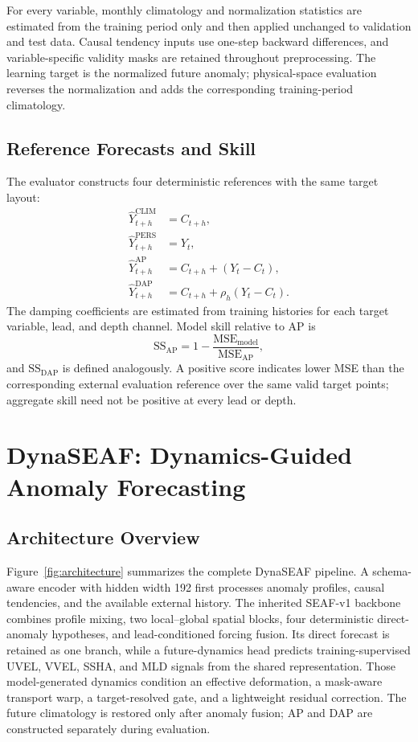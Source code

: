 \documentclass[conference]{IEEEtran}
\begin{document}
For every variable, monthly climatology and normalization statistics are estimated from the training period only and then applied unchanged to validation and test data. Causal tendency inputs use one-step backward differences, and variable-specific validity masks are retained throughout preprocessing. The learning target is the normalized future anomaly; physical-space evaluation reverses the normalization and adds the corresponding training-period climatology.

\subsection{Reference Forecasts and Skill}
The evaluator constructs four deterministic references with the same target layout:
\begin{align}
\widehat{Y}^{\mathrm{CLIM}}_{t+h}&=C_{t+h},\\
\widehat{Y}^{\mathrm{PERS}}_{t+h}&=Y_t,\\
\widehat{Y}^{\mathrm{AP}}_{t+h}&=C_{t+h}+(Y_t-C_t),\\
\widehat{Y}^{\mathrm{DAP}}_{t+h}&=C_{t+h}+\rho_h(Y_t-C_t).
\label{eq:references}
\end{align}
The damping coefficients are estimated from training histories for each target variable, lead, and depth channel. Model skill relative to AP is
\begin{equation}
\mathrm{SS}_{\mathrm{AP}}=1-\frac{\mathrm{MSE}_{\mathrm{model}}}{\mathrm{MSE}_{\mathrm{AP}}},
\label{eq:ssap}
\end{equation}
and $\mathrm{SS}_{\mathrm{DAP}}$ is defined analogously. A positive score indicates lower MSE than the corresponding external evaluation reference over the same valid target points; aggregate skill need not be positive at every lead or depth.

\section{DynaSEAF: Dynamics-Guided Anomaly Forecasting}

\subsection{Architecture Overview}
Figure~\ref{fig:architecture} summarizes the complete DynaSEAF pipeline. A schema-aware encoder with hidden width 192 first processes anomaly profiles, causal tendencies, and the available external history. The inherited SEAF-v1 backbone combines profile mixing, two local--global spatial blocks, four deterministic direct-anomaly hypotheses, and lead-conditioned forcing fusion. Its direct forecast is retained as one branch, while a future-dynamics head predicts training-supervised UVEL, VVEL, SSHA, and MLD signals from the shared representation. Those model-generated dynamics condition an effective deformation, a mask-aware transport warp, a target-resolved gate, and a lightweight residual correction. The future climatology is restored only after anomaly fusion; AP and DAP are constructed separately during evaluation.
\end{document}
